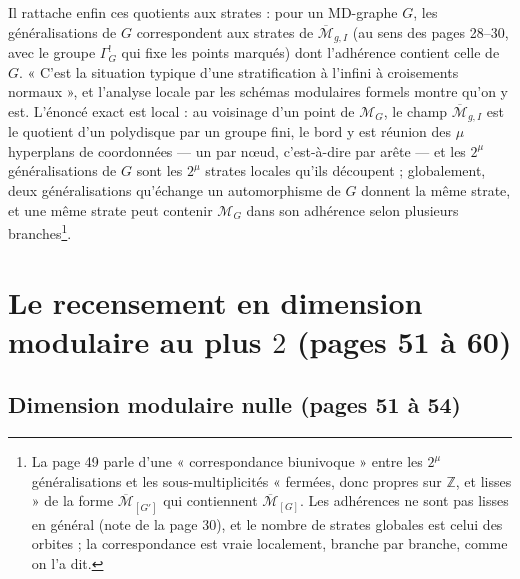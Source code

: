 \documentclass[11pt,a4paper]{article}
\begin{document}
Il rattache enfin ces quotients aux strates : pour un MD-graphe $G$, les
généralisations de $G$ correspondent aux strates de
$\overline{\mathcal{M}}_{g,I}$ (au sens des pages 28--30, avec le groupe
$\Gamma^{!}_G$ qui fixe les points marqués) dont l'adhérence contient celle de
$G$. « C'est la situation typique d'une stratification à l'infini à croisements
normaux », et l'analyse locale par les schémas modulaires formels montre qu'on y
est. L'énoncé exact est local : au voisinage d'un point de $\mathcal{M}_G$, le
champ $\overline{\mathcal{M}}_{g,I}$ est le quotient d'un polydisque par un groupe
fini, le bord y est réunion des $\mu$ hyperplans de coordonnées — un par nœud,
c'est-à-dire par arête — et les $2^\mu$ généralisations de $G$ sont les $2^\mu$
strates locales qu'ils découpent ; globalement, deux généralisations qu'échange
un automorphisme de $G$ donnent la même strate, et une même strate peut
contenir $\mathcal{M}_G$ dans son adhérence selon plusieurs
branches\footnote{La page 49 parle d'une « correspondance biunivoque » entre
les $2^\mu$ généralisations et les sous-multiplicités « fermées, donc propres sur
$\mathbb{Z}$, et lisses » de la forme $\overline{\mathcal{M}}_{[G']}$ qui
contiennent $\overline{\mathcal{M}}_{[G]}$. Les adhérences ne sont pas lisses en
général (note de la page 30), et le nombre de strates globales est celui des
orbites ; la correspondance est vraie localement, branche par branche, comme on
l'a dit.}.

\section*{Le recensement en dimension modulaire au plus $2$ (pages 51 à 60)}

\subsection*{Dimension modulaire nulle (pages 51 à 54)}
\end{document}
